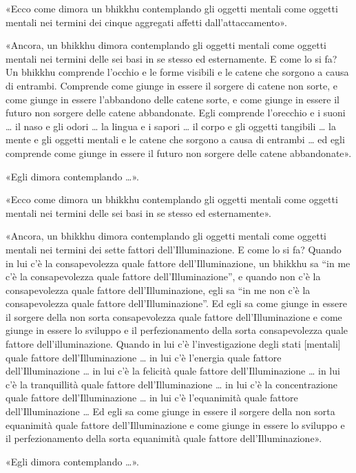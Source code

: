 «Ecco come dimora un bhikkhu contemplando gli oggetti mentali come
oggetti mentali nei termini dei cinque aggregati affetti
dall’attaccamento».


«Ancora, un bhikkhu dimora contemplando gli oggetti mentali come oggetti
mentali nei termini delle sei basi in se stesso ed esternamente. E come
lo si fa? Un bhikkhu comprende l’occhio e le forme visibili e le catene
che sorgono a causa di entrambi. Comprende come giunge in essere il
sorgere di catene non sorte, e come giunge in essere l’abbandono delle
catene sorte, e come giunge in essere il futuro non sorgere delle catene
abbandonate. Egli comprende l’orecchio e i suoni … il naso e gli odori …
la lingua e i sapori … il corpo e gli oggetti tangibili … la mente e gli
oggetti mentali e le catene che sorgono a causa di entrambi … ed egli
comprende come giunge in essere il futuro non sorgere delle catene
abbandonate».


«Egli dimora contemplando …».


«Ecco come dimora un bhikkhu contemplando gli oggetti mentali come
oggetti mentali nei termini delle sei basi in se stesso ed
esternamente».


«Ancora, un bhikkhu dimora contemplando gli oggetti mentali come oggetti
mentali nei termini dei sette fattori dell’Illuminazione. E come lo si
fa? Quando in lui c’è la consapevolezza quale fattore
dell’Illuminazione, un bhikkhu sa “in me c’è la consapevolezza quale
fattore dell’Illuminazione”, e quando non c’è la consapevolezza quale
fattore dell’Illuminazione, egli sa “in me non c’è la consapevolezza
quale fattore dell’Illuminazione”. Ed egli sa come giunge in essere il
sorgere della non sorta consapevolezza quale fattore dell’Illuminazione
e come giunge in essere lo sviluppo e il perfezionamento della sorta
consapevolezza quale fattore dell’illuminazione. Quando in lui c’è
l’investigazione degli stati [mentali] quale fattore dell’Illuminazione
… in lui c’è l’energia quale fattore dell’Illuminazione … in lui c’è la
felicità quale fattore dell’Illuminazione … in lui c’è la tranquillità
quale fattore dell’Illuminazione … in lui c’è la concentrazione quale
fattore dell’Illuminazione … in lui c’è l’equanimità quale fattore
dell’Illuminazione … Ed egli sa come giunge in essere il sorgere della
non sorta equanimità quale fattore dell’Illuminazione e come giunge in
essere lo sviluppo e il perfezionamento della sorta equanimità quale
fattore dell’Illuminazione».


«Egli dimora contemplando …».


